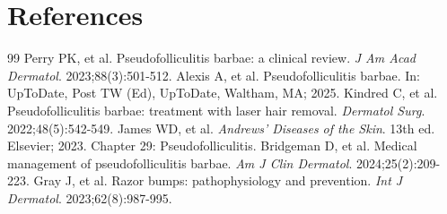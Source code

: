 \section*{References}

\begin{thebibliography}{99}
 Perry PK, et al. Pseudofolliculitis barbae: a clinical review. \emph{J Am Acad Dermatol}. 2023;88(3):501-512.
 Alexis A, et al. Pseudofolliculitis barbae. In: UpToDate, Post TW (Ed), UpToDate, Waltham, MA; 2025.
 Kindred C, et al. Pseudofolliculitis barbae: treatment with laser hair removal. \emph{Dermatol Surg}. 2022;48(5):542-549.
 James WD, et al. \emph{Andrews' Diseases of the Skin}. 13th ed. Elsevier; 2023. Chapter 29: Pseudofolliculitis.
 Bridgeman D, et al. Medical management of pseudofolliculitis barbae. \emph{Am J Clin Dermatol}. 2024;25(2):209-223.
 Gray J, et al. Razor bumps: pathophysiology and prevention. \emph{Int J Dermatol}. 2023;62(8):987-995.
\end{thebibliography}
